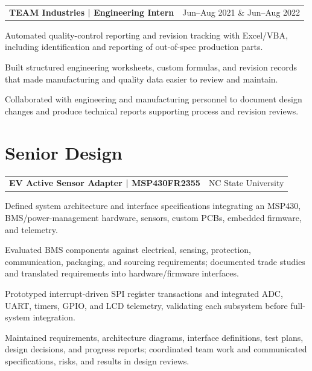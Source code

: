 \documentclass[10pt,letterpaper]{article}
\makeatletter
\newcommand{\resumeentry}[3]{%
  \begin{tabularx}{\textwidth}{@{}Xr@{}}
    \textbf{#1} & #2
  \end{tabularx}\vspace{-0.08cm}
  #3
}
\makeatother
\begin{document}
\resumeentry{TEAM Industries | Engineering Intern}{Jun--Aug 2021 \& Jun--Aug 2022}{
\begin{resumebullets}
  \item Automated quality-control reporting and revision tracking with Excel/VBA, including identification and reporting of out-of-spec production parts.
  \item Built structured engineering worksheets, custom formulas, and revision records that made manufacturing and quality data easier to review and maintain.
  \item Collaborated with engineering and manufacturing personnel to document design changes and produce technical reports supporting process and revision reviews.
\end{resumebullets}}

\section{Senior Design}
\resumeentry{EV Active Sensor Adapter | MSP430FR2355}{NC State University}{
\begin{resumebullets}
  \item Defined system architecture and interface specifications integrating an MSP430, BMS/power-management hardware, sensors, custom PCBs, embedded firmware, and telemetry.
  \item Evaluated BMS components against electrical, sensing, protection, communication, packaging, and sourcing requirements; documented trade studies and translated requirements into hardware/firmware interfaces.
  \item Prototyped interrupt-driven SPI register transactions and integrated ADC, UART, timers, GPIO, and LCD telemetry, validating each subsystem before full-system integration.
  \item Maintained requirements, architecture diagrams, interface definitions, test plans, design decisions, and progress reports; coordinated team work and communicated specifications, risks, and results in design reviews.
\end{resumebullets}}
\end{document}
